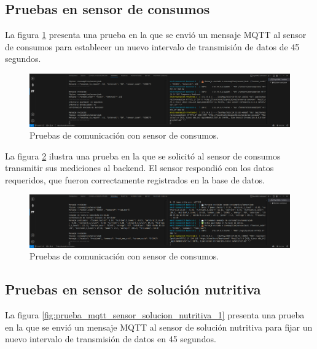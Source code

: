 \subsection{Pruebas en sensor de consumos}

La figura \ref{fig:prueba_mqtt_sensor_consumos_1} presenta una prueba en la que
se envió un mensaje MQTT al sensor de consumos para establecer un nuevo
intervalo de transmisión de datos de 45 segundos.

\begin{figure}[H]
    \centering
    \includegraphics[width=\textwidth]{Images/56_prueba_mqtt_sensor_consumos_1.png}
    \caption[Pruebas de comunicación con sensor de consumos]{Pruebas de comunicación con sensor de consumos.}
    \label{fig:prueba_mqtt_sensor_consumos_1}
\end{figure}

La figura \ref{fig:prueba_mqtt_sensor_consumos_2} ilustra una prueba en la que
se solicitó al sensor de consumos transmitir sus mediciones al backend. El
sensor respondió con los datos requeridos, que fueron correctamente registrados
en la base de datos.

\begin{figure}[H]
    \centering
    \includegraphics[width=\textwidth]{Images/56_prueba_mqtt_sensor_consumos_2.png}
    \caption[Pruebas de comunicación con sensor de consumos]{Pruebas de comunicación con sensor de consumos.}
    \label{fig:prueba_mqtt_sensor_consumos_2}
\end{figure}

\subsection{Pruebas en sensor de solución nutritiva}

La figura \ref{fig:prueba_mqtt_sensor_solucion_nutritiva_1} presenta una prueba
en la que se envió un mensaje MQTT al sensor de solución nutritiva para fijar
un nuevo intervalo de transmisión de datos en 45 segundos.

